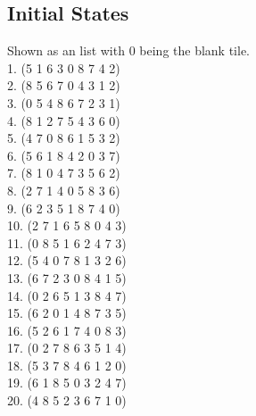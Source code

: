 \documentclass[11pt, oneside]{article}   	%
\begin{document}
\subsection{Initial States}
Shown as an list with 0 being the blank tile.\\
1. (5 1 6 3 0 8 7 4 2)\\
2. (8 5 6 7 0 4 3 1 2)\\
3. (0 5 4 8 6 7 2 3 1)\\
4. (8 1 2 7 5 4 3 6 0)\\
5. (4 7 0 8 6 1 5 3 2)\\
6. (5 6 1 8 4 2 0 3 7)\\
7. (8 1 0 4 7 3 5 6 2)\\
8. (2 7 1 4 0 5 8 3 6)\\
9. (6 2 3 5 1 8 7 4 0)\\
10. (2 7 1 6 5 8 0 4 3)\\
11. (0 8 5 1 6 2 4 7 3)\\
12. (5 4 0 7 8 1 3 2 6)\\
13. (6 7 2 3 0 8 4 1 5)\\
14. (0 2 6 5 1 3 8 4 7)\\
15. (6 2 0 1 4 8 7 3 5)\\
16. (5 2 6 1 7 4 0 8 3)\\
17. (0 2 7 8 6 3 5 1 4)\\
18. (5 3 7 8 4 6 1 2 0)\\
19. (6 1 8 5 0 3 2 4 7)\\
20. (4 8 5 2 3 6 7 1 0)
\end{document}

